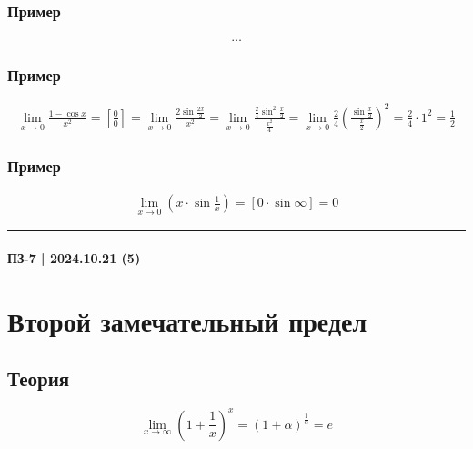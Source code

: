 \documentclass{article}
\begin{document}
\subsubsection{Пример}
\begin{gather*}
    \dots
\end{gather*}

\subsubsection{Пример}
\begin{gather*}
    \lim_{x \to 0} \frac{1 - \cos x}{x^2} =
    \left[ \frac{0}{0} \right] =
    \lim_{x \to 0} \frac{2 \sin \frac{2x}{2}}{x^2} =
    \lim_{x \to 0} \frac{\frac{2}{4} \sin^2 \frac{x}{2}}{\frac{x^2}{4}} =
    \lim_{x \to 0} \frac{2}{4} \left( \frac{\sin \frac{x}{2}}{\frac{x}{2}} \right)^2 =
    \frac{2}{4} \cdot 1^2 = \frac{1}{2}
\end{gather*}

\subsubsection{Пример}
\begin{gather*}
    \lim_{x \to 0} \left( x \cdot \sin \frac{1}{x} \right) =
    [0 \cdot \sin \infty] = 0
\end{gather*}



\par\noindent\rule{\textwidth}{1pt}
\paragraph{ПЗ-7 | 2024.10.21 (5)}
\section{Второй замечательный предел}

\subsection{Теория}
\[
    \lim_{x \to \infty} \left( 1 + \frac{1}{x} \right)^x = \left( 1 + \alpha \right)^{\frac{1}{\alpha}} = e
\]
\end{document}
